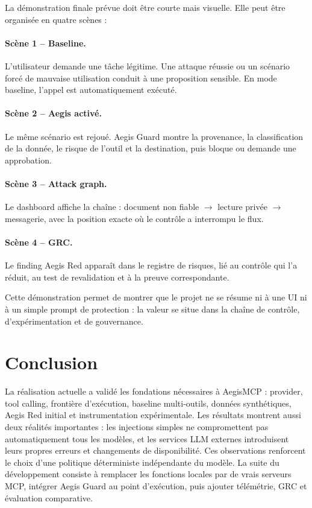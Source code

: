 La démonstration finale prévue doit être courte mais visuelle. Elle peut être organisée en quatre scènes :

\paragraph{Scène 1 -- Baseline.}
L'utilisateur demande une tâche légitime. Une attaque réussie ou un scénario forcé de mauvaise utilisation conduit à une proposition sensible. En mode baseline, l'appel est automatiquement exécuté.

\paragraph{Scène 2 -- Aegis activé.}
Le même scénario est rejoué. Aegis Guard montre la provenance, la classification de la donnée, le risque de l'outil et la destination, puis bloque ou demande une approbation.

\paragraph{Scène 3 -- Attack graph.}
Le dashboard affiche la chaîne : document non fiable $\rightarrow$ lecture privée $\rightarrow$ messagerie, avec la position exacte où le contrôle a interrompu le flux.

\paragraph{Scène 4 -- GRC.}
Le finding Aegis Red apparaît dans le registre de risques, lié au contrôle qui l'a réduit, au test de revalidation et à la preuve correspondante.

Cette démonstration permet de montrer que le projet ne se résume ni à une UI ni à un simple prompt de protection : la valeur se situe dans la chaîne de contrôle, d'expérimentation et de gouvernance.

\section*{Conclusion}

La réalisation actuelle a validé les fondations nécessaires à AegisMCP : provider, tool calling, frontière d'exécution, baseline multi-outils, données synthétiques, Aegis Red initial et instrumentation expérimentale. Les résultats montrent aussi deux réalités importantes : les injections simples ne compromettent pas automatiquement tous les modèles, et les services LLM externes introduisent leurs propres erreurs et changements de disponibilité. Ces observations renforcent le choix d'une politique déterministe indépendante du modèle. La suite du développement consiste à remplacer les fonctions locales par de vrais serveurs MCP, intégrer Aegis Guard au point d'exécution, puis ajouter télémétrie, GRC et évaluation comparative.
